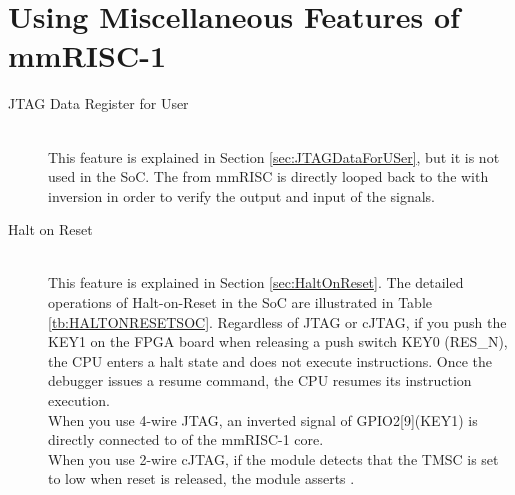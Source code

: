 \section{Using Miscellaneous Features of mmRISC-1}
\label{sec:MISCELLANEOUS}

\begin{description}

    \item[JTAG Data Register for User]\mbox{}\\
    This feature is explained in Section \ref{sec:JTAGDataForUSer}, but it is not used in the SoC. The  from mmRISC is directly looped back to the  with inversion in order to verify the output and input of the signals.

    \item[Halt on Reset]\mbox{}\\
    This feature is explained in Section \ref{sec:HaltOnReset}. The detailed operations of Halt-on-Reset in the SoC are illustrated in Table \ref{tb:HALTONRESETSOC}. Regardless of JTAG or cJTAG,  if you push the KEY1 on the FPGA board when releasing a push switch KEY0 (RES\_N), the CPU enters a halt state and does not execute instructions. Once the debugger issues a resume command, the CPU resumes its instruction execution.\\
    When you use 4-wire JTAG, an inverted signal of GPIO2[9](KEY1) is directly connected to   of the mmRISC-1 core.\\
    When you use 2-wire cJTAG, if the module  detects that the TMSC is set to low when reset is released, the module asserts .
    

\end{description}
